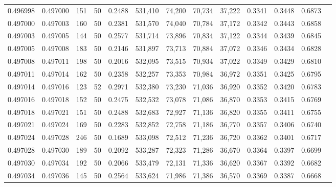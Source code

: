\begin{tabular}{rrrrrrrrrrrrr}
0.496998 & 0.497000 &   151 &  50 &                                     0.2488 & 531,410 &  74,200 &  70,734 &  37,222 & 0.3341 & 0.3448 & 0.6873 \\
0.497000 & 0.497003 &   160 &  50 &                                     0.2381 & 531,570 &  74,040 &  70,784 &  37,172 & 0.3342 & 0.3443 & 0.6858 \\
0.497003 & 0.497005 &   144 &  50 &                                     0.2577 & 531,714 &  73,896 &  70,834 &  37,122 & 0.3344 & 0.3439 & 0.6845 \\
0.497005 & 0.497008 &   183 &  50 &                                     0.2146 & 531,897 &  73,713 &  70,884 &  37,072 & 0.3346 & 0.3434 & 0.6828 \\
0.497008 & 0.497011 &   198 &  50 &                                     0.2016 & 532,095 &  73,515 &  70,934 &  37,022 & 0.3349 & 0.3429 & 0.6810 \\
0.497011 & 0.497014 &   162 &  50 &                                     0.2358 & 532,257 &  73,353 &  70,984 &  36,972 & 0.3351 & 0.3425 & 0.6795 \\
0.497014 & 0.497016 &   123 &  52 &                                     0.2971 & 532,380 &  73,230 &  71,036 &  36,920 & 0.3352 & 0.3420 & 0.6783 \\
0.497016 & 0.497018 &   152 &  50 &                                     0.2475 & 532,532 &  73,078 &  71,086 &  36,870 & 0.3353 & 0.3415 & 0.6769 \\
0.497018 & 0.497021 &   151 &  50 &                                     0.2488 & 532,683 &  72,927 &  71,136 &  36,820 & 0.3355 & 0.3411 & 0.6755 \\
0.497021 & 0.497024 &   169 &  50 &                                     0.2283 & 532,852 &  72,758 &  71,186 &  36,770 & 0.3357 & 0.3406 & 0.6740 \\
0.497024 & 0.497028 &   246 &  50 &                                     0.1689 & 533,098 &  72,512 &  71,236 &  36,720 & 0.3362 & 0.3401 & 0.6717 \\
0.497028 & 0.497030 &   189 &  50 &                                     0.2092 & 533,287 &  72,323 &  71,286 &  36,670 & 0.3364 & 0.3397 & 0.6699 \\
0.497030 & 0.497034 &   192 &  50 &                                     0.2066 & 533,479 &  72,131 &  71,336 &  36,620 & 0.3367 & 0.3392 & 0.6682 \\
0.497034 & 0.497036 &   145 &  50 &                                     0.2564 & 533,624 &  71,986 &  71,386 &  36,570 & 0.3369 & 0.3387 & 0.6668 \\

\end{tabular}
